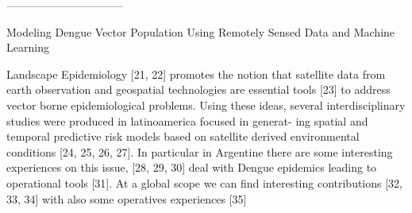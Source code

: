 --------------------------------

Modeling Dengue Vector Population Using Remotely
Sensed Data and Machine Learning


Landscape Epidemiology [21, 22] promotes the notion that satellite data
from earth observation and geospatial technologies are essential tools [23] to
address vector borne epidemiological problems. Using these ideas, several
interdisciplinary studies were produced in latinoamerica focused in generat-
ing spatial and temporal predictive risk models based on satellite derived
environmental conditions [24, 25, 26, 27]. In particular in Argentine there
are some interesting experiences on this issue, [28, 29, 30] deal with Dengue
epidemics leading to operational tools [31]. At a global scope we can find
interesting contributions [32, 33, 34] with also some operatives experiences
[35]





